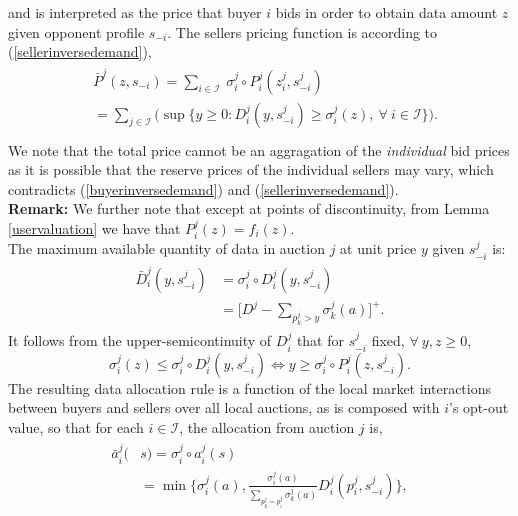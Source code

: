 \documentclass[sigconf, anonymous]{acmart}
\newcommand{\vs}{\varsigma}
\newcommand{\mcI}{\mathcal{I}}
\newcommand{\g}{\sigma}
\theoremstyle{definition}
\begin{document}
and is interpreted as the price that buyer $i$ bids in
order to obtain
data amount $z$ given opponent profile $s_{-i}$.
The sellers pricing function is according to (\ref{sellerinversedemand}), 
\begin{align}\label{dataprice}
\begin{split}
    &\bar{P}^j(z, s_{-i}) =\displaystyle\sum_{i\in\mcI} \ \g_i^j \circ P_i^j(z_i^j,
s_{-i}^j) \\
    &= \sum_{j\in\mcI}\bigg(\sup\bigg\lbrace y\ge 0 : 
    {D_i^j}(y,s_{-i}^j) \ge \g_i^j(z), \ \forall \ i\in\mcI \bigg\rbrace \bigg).\\
\end{split}
\end{align}
We note that
the total price cannot be an aggragation of the
\emph{individual} bid prices as it is possible that the reserve prices
of the individual sellers may vary, which contradicts
(\ref{buyerinversedemand}) and (\ref{sellerinversedemand}).\\
\textbf{Remark:} We further note that except at points of discontinuity, from
Lemma \ref{uservaluation} we have that $P_i^j(z) = f_i(z)$. \\
The maximum available quantity of data in auction
$j$ at unit price $y$ given $s_{-i}^j$ is: 
\begin{align}
\begin{split}\label{datacomposed}
    \bar{D}_i^j(y,s_{-i}^j) &= \g_i^j \circ D_i^j( y,s_{-i}^j)\\
    &= \bigg\lbrack D^j - \sum_{p_k^j> y} \g_k^j(a)\bigg\rbrack^+.
\end{split}
\end{align}
It follows from the upper-semicontinuity of $D_i^j$ that for $s_{-i}^j$ fixed, $\forall \ y,z \ge 0$,
\begin{equation}\label{dtop}
    \g_i^j(z) \le \g_i^j \circ D_i^j(y,s_{-i}^j) \Leftrightarrow y \ge \g_i^j
\circ P_i^j(z,s_{-i}^j).
\end{equation}
The resulting data allocation rule is a function of the local market
interactions between buyers and sellers over all local auctions, as is composed with $i$'s opt-out value, so that for each $i \in \mcI$, the
allocation from auction $j$ is,
\begin{align}\label{dataallocation}
\begin{split}
    \bar{a}_i^j(&s) = \g_i^j \circ a_i^j(s) \\
    &= \min\bigg\lbrace \g_i^j(a), 
    \frac{\g_i^j(a)}{\displaystyle\sum_{p_k^j= p_i^j}\g_k^j(a)} 
D_i^j(p_i^j,s_{-i}^j)\bigg\rbrace,
\end{split}
\end{align}
\end{document}
